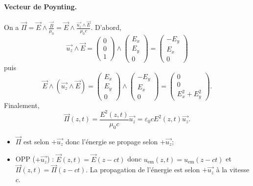 \paragraph{Vecteur de Poynting.} On a $\vec{\Pi}=\vec{E}\wedge\frac{\vec{B}}{\mu_0}=\vec{E}\wedge\frac{\vec{u_z}\wedge\vec{E}}{\mu_0c}$. D'abord,
\begin{equation*}
    \vec{u_z}\wedge\vec{E}=\begin{pmatrix}
        0\\0\\1
    \end{pmatrix}\wedge\begin{pmatrix}
        E_x\\E_y\\0
    \end{pmatrix}=\begin{pmatrix}
        -E_y\\E_x\\0
    \end{pmatrix}
\end{equation*}
puis
\begin{equation*}
    \vec{E}\wedge(\vec{u_z}\wedge\vec{E})=\begin{pmatrix}
        E_x\\E_y\\0
    \end{pmatrix}\wedge\begin{pmatrix}
        -E_y\\E_x\\0
    \end{pmatrix}=\begin{pmatrix}
        0\\0\\E_x^{2}+E_y^{2}
    \end{pmatrix}.
\end{equation*}
Finalement,
\begin{equation*}
    \boxed{
        \vec{\Pi}(z,t)=\frac{E^{2}(z,t)}{\mu_0c}\vec{u_z}=\varepsilon_0cE^{2}(z,t)\vec{u_z}.
    }
\end{equation*}

\begin{remark}
    \begin{itemize}
        \item $\vec{\Pi}$ est selon $+\vec{u_z}$ donc l'énergie se propage selon $+\vec{u_z}$;
        \item OPP ($+\vec{u_z}$) : $\vec{E}(z,t)=\vec{E}(z-ct)$ donc $u_{\mathrm{em}}(z,t)=u_{\mathrm{em}}(z-ct)$ et $\vec{\Pi}(z,t)=\vec{\Pi}(z-ct)$. La propagation de l'énergie est selon $+\vec{u_z}$ à la vitesse $c$.
    \end{itemize}
\end{remark}


